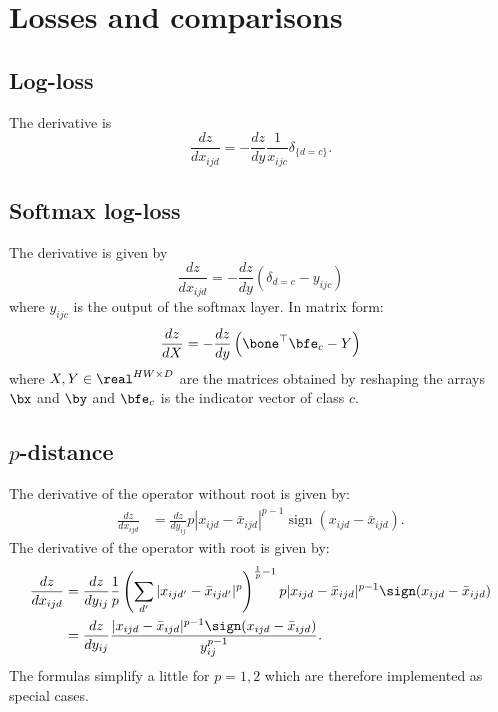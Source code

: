\section{Losses and comparisons}\label{s:impl-losses}

\subsection{Log-loss}\label{s:impl-loss}

The derivative is
\[
\frac{dz}{dx_{ijd}} = - \frac{dz}{dy} \frac{1}{x_{ijc}} \delta_{\{d = c\}}.
\]

\subsection{Softmax log-loss}\label{s:impl-sfloss}

The derivative is given by
\[
\frac{dz}{dx_{ijd}} 
= - \frac{dz}{dy} \left(\delta_{d=c} - y_{ijc}\right)
\]
where $y_{ijc}$ is the output of the softmax layer. In matrix form:
\[
\frac{dz}{dX} 
= - \frac{dz}{dy} \left(\bone^\top \bfe_c - Y\right)
\]
where $X,Y\in\real^{HW\times D}$ are the matrices obtained by reshaping the arrays
$\bx$ and $\by$ and $\bfe_c$ is the indicator vector of class $c$.

\subsection{$p$-distance}\label{s:impl-pdistance}

The derivative of the operator without root is given by:
\begin{align*}
\frac{dz}{dx_{ijd}}
&=
\frac{dz}{dy_{ij}}
p |x_{ijd} - \bar x_{ijd}|^{p-1} \operatorname{sign} (x_{ijd} - \bar x_{ijd}).
\end{align*}
The derivative of the operator with root is given by:
\begin{align*}
\frac{dz}{dx_{ijd}}
&=
\frac{dz}{dy_{ij}}
\frac{1}{p}
\left(\sum_{d'} |x_{ijd'} - \bar x_{ijd'}|^p \right)^{\frac{1}{p}-1}
p |x_{ijd} - \bar x_{ijd}|^{p-1} \sign(x_{ijd} - \bar x_{ijd})
\\
&= 
\frac{dz}{dy_{ij}}
\frac{|x_{ijd} - \bar x_{ijd}|^{p-1} \sign(x_{ijd} - \bar x_{ijd})}{y_{ij}^{p-1}}.
\end{align*}
The formulas simplify a little for $p=1,2$ which are therefore implemented as special cases.

